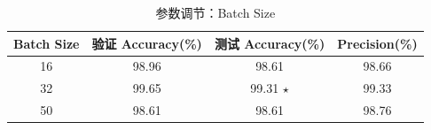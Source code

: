 \begin{table}[htbp]\centering
\caption{参数调节：Batch Size}
\label{tab:sweepbatch_size}
\begin{tabular}{cccc}
\toprule
Batch Size & 验证 Accuracy(\%) & 测试 Accuracy(\%) & Precision(\%) \\
\midrule
16 & 98.96 & 98.61 & 98.66 \\
32 & 99.65 & 99.31 $\star$ & 99.33 \\
50 & 98.61 & 98.61 & 98.76 \\
\bottomrule
\end{tabular}
\end{table}
